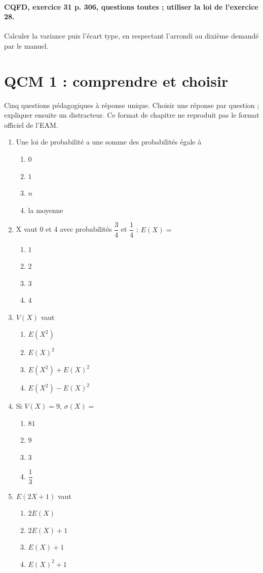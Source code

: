 \paragraph{CQFD, exercice 31 p. 306, questions toutes ; utiliser la loi de l’exercice 28.}\label{C08-M2} Calculer la variance puis l’écart type, en respectant l’arrondi au dixième demandé par le manuel.
\begingroup\small
\clearpage\section*{QCM 1 : comprendre et choisir}\label{C08-Q1}
Cinq questions pédagogiques à réponse unique. Choisir une réponse par question ; expliquer ensuite un distracteur. Ce format de chapitre ne reproduit pas le format officiel de l’EAM.
\begin{enumerate}
\item Une loi de probabilité a une somme des probabilités égale à
\begin{enumerate}[label=\Alph*.,itemsep=2pt]
\item $0$
\item $1$
\item $n$
\item la moyenne
\end{enumerate}
\item X vaut 0 et 4 avec probabilités $\dfrac{3}{4}$ et $\dfrac{1}{4}$ ; $E(X)=$
\begin{enumerate}[label=\Alph*.,itemsep=2pt]
\item $1$
\item $2$
\item $3$
\item $4$
\end{enumerate}
\item $V(X)$ vaut
\begin{enumerate}[label=\Alph*.,itemsep=2pt]
\item $E(X^2)$
\item $E(X)^2$
\item $E(X^2)+E(X)^2$
\item $E(X^2)-E(X)^2$
\end{enumerate}
\item Si $V(X)=9$, $\sigma(X)=$
\begin{enumerate}[label=\Alph*.,itemsep=2pt]
\item $81$
\item $9$
\item $3$
\item $\dfrac{1}{3}$
\end{enumerate}
\item $E(2X+1)$ vaut
\begin{enumerate}[label=\Alph*.,itemsep=2pt]
\item $2E(X)$
\item $2E(X)+1$
\item $E(X)+1$
\item $E(X)^2+1$
\end{enumerate}
\end{enumerate}
